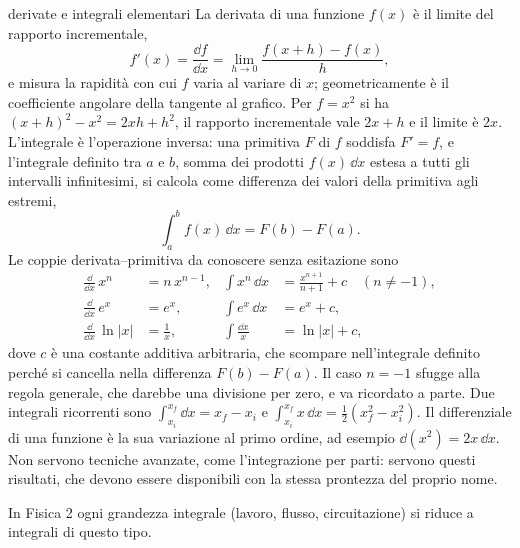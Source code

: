 \documentclass[main.tex]{subfiles}
\begin{document}
\renewcommand{\richiamoprefix}{Richiamo di Matematica --- }
\begin{riquadro}{derivate e integrali elementari}
La derivata di una funzione $f(x)$ è il limite del rapporto incrementale,
\[
f'(x)=\frac{\dd f}{\dd x}=\lim_{h\to0}\frac{f(x+h)-f(x)}{h},
\]
e misura la rapidità con cui $f$ varia al variare di $x$; geometricamente è il coefficiente angolare della tangente al grafico. Per $f=x^2$ si ha $(x+h)^2-x^2=2xh+h^2$, il rapporto incrementale vale $2x+h$ e il limite è $2x$. L'integrale è l'operazione inversa: una primitiva $F$ di $f$ soddisfa $F'=f$, e l'integrale definito tra $a$ e $b$, somma dei prodotti $f(x)\,\dd x$ estesa a tutti gli intervalli infinitesimi, si calcola come differenza dei valori della primitiva agli estremi,
\[
\int_a^b f(x)\,\dd x=F(b)-F(a).
\]
Le coppie derivata--primitiva da conoscere senza esitazione sono
\begin{align*}
\frac{\dd}{\dd x}\,x^n&=n\,x^{n-1}, & \int x^n\,\dd x&=\frac{x^{n+1}}{n+1}+c\quad(n\neq-1),\\
\frac{\dd}{\dd x}\,e^{x}&=e^{x}, & \int e^{x}\,\dd x&=e^{x}+c,\\
\frac{\dd}{\dd x}\,\ln|x|&=\frac1x, & \int\frac{\dd x}{x}&=\ln|x|+c ,
\end{align*}
dove $c$ è una costante additiva arbitraria, che scompare nell'integrale definito perché si cancella nella differenza $F(b)-F(a)$. Il caso $n=-1$ sfugge alla regola generale, che darebbe una divisione per zero, e va ricordato a parte. Due integrali ricorrenti sono $\int_{x_i}^{x_f}\dd x=x_f-x_i$ e $\int_{x_i}^{x_f}x\,\dd x=\tfrac12\left(x_f^2-x_i^2\right)$. Il differenziale di una funzione è la sua variazione al primo ordine, ad esempio $\dd(x^2)=2x\,\dd x$. Non servono tecniche avanzate, come l'integrazione per parti: servono questi risultati, che devono essere disponibili con la stessa prontezza del proprio nome.

In Fisica 2 ogni grandezza integrale (lavoro, flusso, circuitazione) si riduce a integrali di questo tipo.
\end{riquadro}
\end{document}
